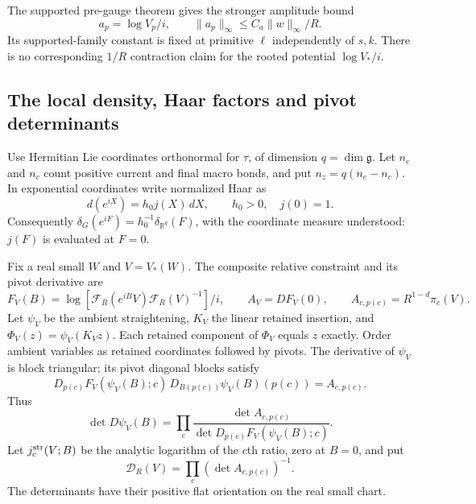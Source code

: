 \documentclass[11pt]{article}
\theoremstyle{remark}
\begin{document}
The supported pre-gauge theorem gives the stronger amplitude
bound
\begin{equation}\label{cmi-pregauge-amplitude}
 a_p=\log V_p/i,\qquad
 \|a_p\|_\infty\le C_a\|w\|_\infty/R.
\end{equation}
Its supported-family constant is fixed at primitive $\ell$
independently of $s,k$. There is no corresponding $1/R$
contraction claim for the rooted potential $\log V_*/i$.

\subsection{The local density, Haar factors and pivot determinants}
\label{cmi-density-section}

Use Hermitian Lie coordinates orthonormal for $\tau$, of
dimension $q=\dim\mathfrak g$. Let $n_e$ and $n_c$ count
positive current and final macro bonds, and put
$n_z=q(n_e-n_c)$. In exponential coordinates write normalized
Haar as
\begin{equation}\label{cmi-Haar}
 d(e^{iX})=h_0j(X)\,dX,\qquad h_0>0,\quad j(0)=1.
\end{equation}
Consequently
$\delta_G(e^{iF})=h_0^{-1}\delta_{\mathbb R^q}(F)$,
with the coordinate measure understood: $j(F)$ is evaluated
at $F=0$.

Fix a real small $W$ and $V=V_*(W)$. The composite relative
constraint and its pivot derivative are
\begin{equation}\label{cmi-relative}
 F_V(B)=\log[\mathcal F_R(e^{iB}V)\mathcal F_R(V)^{-1}]/i,
 \qquad A_V=D F_V(0),\qquad
 A_{c,p(c)}=R^{1-d}\pi_c(V).
\end{equation}
Let $\psi_V$ be the ambient straightening, $K_V$ the linear
retained insertion, and $\Phi_V(z)=\psi_V(K_Vz)$.
Each retained component of $\Phi_V$ equals $z$ exactly.
Order ambient variables as retained coordinates followed by
pivots. The derivative of $\psi_V$ is block triangular;
its pivot diagonal blocks satisfy
\[
 D_{p(c)}F_V(\psi_V(B);c)\,
 D_{B(p(c))}\psi_V(B)(p(c))=A_{c,p(c)}.
\]
Thus
\begin{equation}\label{cmi-ambient-Jacobian}
 \det D\psi_V(B)=
   \prod_c\frac{\det A_{c,p(c)}}
                  {\det D_{p(c)}F_V(\psi_V(B);c)}.
\end{equation}
Let $j_c^{\rm str}(V;B)$ be the analytic logarithm of the
$c$th ratio, zero at $B=0$, and put
\begin{equation}\label{cmi-background-delta}
 \mathcal D_R(V)=\prod_c(\det A_{c,p(c)})^{-1}.
\end{equation}
The determinants have their positive flat orientation on the
real small chart.
\end{document}
